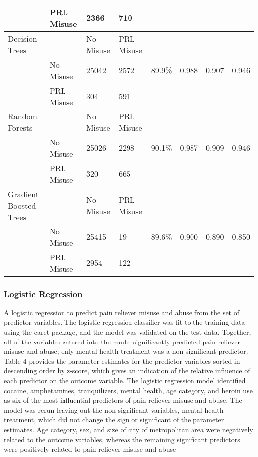 \\\documentclass[sigconf]{acmart}
\begin{document}
\begin{table*}[ht]
\begin{tabular}{llllllll}
     & PRL Misuse & 2366 & 710 &  &  &  & \\
    \midrule
    Decision Trees & & No Misuse & PRL Misuse &  &  &  & \\
     & No Misuse & 25042 & 2572 & 89.9\% & 0.988 & 0.907 & 0.946 \\
     & PRL Misuse & 304 & 591 &  &  &  & \\
    \midrule
    Random Forests & & No Misuse & PRL Misuse &  &  &  & \\
     & No Misuse & 25026 & 2298 & 90.1\% & 0.987 & 0.909 & 0.946 \\
     & PRL Misuse & 320 & 665 &  &  &  & \\
    \midrule
    Gradient Boosted Trees & & No Misuse & PRL Misuse &  &  &  & \\
     & No Misuse & 25415 & 19 & 89.6\% & 0.900 & 0.890 & 0.850 \\
     & PRL Misuse & 2954 & 122 &  &  &  & \\
    \bottomrule
  \end{tabular}
\end{table*}


\subsubsection{Logistic Regression}
 
A logistic regression to predict pain reliever misuse and abuse
from the set of predictor variables. The logistic regression classifier was fit to 
the training data using the caret package, and the model was validated on the test 
data. Together, all of the variables entered into the model significantly predicted 
pain reliever misuse and abuse; only mental health treatment was a non-significant
predictor. Table 4 provides the parameter estimates for the predictor variables 
sorted in descending order by z-score, which gives an indication of the relative
influence of each predictor on the outcome variable. The logistic regression model 
identified cocaine, amphetamines, tranquilizers, mental health, age category, and 
heroin use as six of the most influential predictors of pain reliever misuse and 
abuse. The model was rerun leaving out the non-significant variables, mental health 
treatment, which did not change the sign or significant of the parameter estimates. 
Age category, sex, and size of city of metropolitan area were negatively related
to the outcome variables, whereas the remaining significant predictors were 
positively related to pain reliever misuse and abuse
\end{document}
